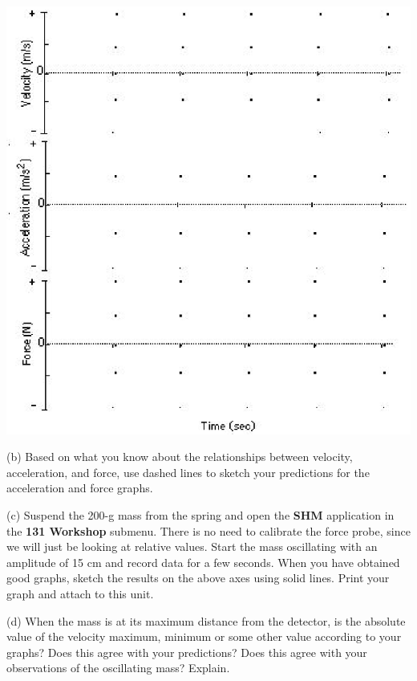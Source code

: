 \vspace{0.3cm}
{\par\centering \includegraphics{periodic_motion/periodic_motion_fig3.eps} \par}
\vspace{0.3cm}

(b) Based on what you know about the relationships between velocity, 
acceleration, and force, use dashed lines to sketch your predictions for the 
acceleration and force graphs.

(c) Suspend the 200-g mass from the spring and open the \textbf{SHM} application in the \textbf{131 Workshop} submenu. There is no need to calibrate the force probe, since we will just be looking at relative values. Start the mass oscillating with an amplitude of 15 cm and record data for a few seconds.
When you have obtained good graphs, sketch the results on the above axes using
solid lines. Print your graph and attach to this unit.

(d) When the mass is at its maximum distance from the detector, is the absolute
 value of the velocity
maximum, minimum or some other value according to your graphs? Does this agree
with your predictions? Does this agree with your observations of the oscillating
mass? Explain.
\vspace{15mm}

